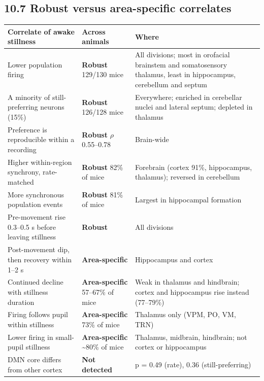 \documentclass[10pt,a4paper]{article}
\begin{document}
\subsection{10.7 Robust versus area-specific correlates}
{\small\renewcommand{\arraystretch}{1.2}
\begin{xltabular}{\linewidth}{>{\hsize\raggedright\arraybackslash}X>{\hsize\raggedright\arraybackslash}X>{\hsize\raggedright\arraybackslash}X}
\toprule
\textbf{Correlate of awake stillness} & \textbf{Across animals} & \textbf{Where} \\
\midrule
\endhead
Lower population firing & \textcolor{okc}{\textbf{Robust}} 129/130 mice & All divisions; most in orofacial brainstem and somatosensory thalamus, least in hippocampus, cerebellum and septum \\
A minority of still-preferring neurons (15\%) & \textcolor{okc}{\textbf{Robust}} 126/128 mice & Everywhere; enriched in cerebellar nuclei and lateral septum; depleted in thalamus \\
Preference is reproducible within a recording & \textcolor{okc}{\textbf{Robust}} $\rho$ 0.55--0.78 & Brain-wide \\
Higher within-region synchrony, rate-matched & \textcolor{okc}{\textbf{Robust}} 82\% of mice & Forebrain (cortex 91\%, hippocampus, thalamus); reversed in cerebellum \\
More synchronous population events & \textcolor{okc}{\textbf{Robust}} 81\% of mice & Largest in hippocampal formation \\
Pre-movement rise 0.3--0.5 s before leaving stillness & \textcolor{okc}{\textbf{Robust}} & All divisions \\
Post-movement dip, then recovery within 1--2 s & \textcolor{partc}{\textbf{Area-specific}} & Hippocampus and cortex \\
Continued decline with stillness duration & \textcolor{partc}{\textbf{Area-specific}} 57--67\% of mice & Weak in thalamus and hindbrain; cortex and hippocampus rise instead (77--79\%) \\
Firing follows pupil within stillness & \textcolor{partc}{\textbf{Area-specific}} 73\% of mice & Thalamus only (VPM, PO, VM, TRN) \\
Lower firing in small-pupil stillness & \textcolor{partc}{\textbf{Area-specific}} \textasciitilde{}80\% of mice & Thalamus, midbrain, hindbrain; not cortex or hippocampus \\
DMN core differs from other cortex & \textcolor{noc}{\textbf{Not detected}} & p = 0.49 (rate), 0.36 (still-preferring) \\
\bottomrule
\end{xltabular}}
\end{document}
